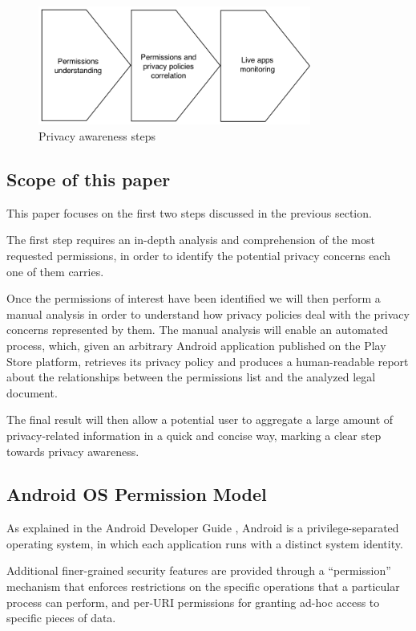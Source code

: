 \documentclass[twoside,letterpaper]{soups}
\theoremstyle{definition}
\begin{document}
\begin{figure}[ht]
\centering
     \includegraphics[width=0.8\textwidth]{images/awareness-steps.png}
      \caption{Privacy awareness steps}
      \label{fig:awareness-steps}
\end{figure}

\subsection{Scope of this paper}
This paper focuses on the first two steps discussed in the previous section.

The first step requires an in-depth analysis and comprehension of the most requested permissions, in order to identify the potential privacy concerns each one of them carries.

Once the permissions of interest have been identified we will then perform a manual analysis in order to understand how privacy policies deal with the privacy concerns represented by them. The manual analysis will enable an automated process, which, given an arbitrary Android application published on the Play Store platform, retrieves its privacy policy and produces a human-readable report about the relationships between the permissions list and the analyzed legal document.

The final result will then allow a potential user to aggregate a large amount of privacy-related information in a quick and concise way, marking a clear step towards privacy awareness.

\subsection{Android OS Permission Model}
\label{sec:android-permission-model}
As explained in the Android Developer Guide \cite{android-developer-guide}, Android is a privilege-separated operating system, in which each application runs with a distinct system identity.

Additional finer-grained security features are provided through a ``permission'' mechanism that enforces restrictions on the specific operations that a particular process can perform, and per-URI permissions for granting ad-hoc access to specific pieces of data.
\end{document}
